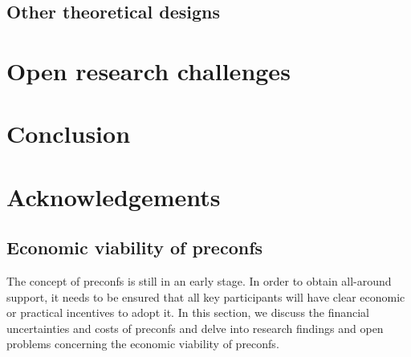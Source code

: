 \documentclass[a4paper]{article}
\theoremstyle{boldstyle}
\begin{document}
        
                

\subsection{Other theoretical designs}

\section{Open research challenges} %


\section{Conclusion}

\section*{Acknowledgements}




\newpage

% 


% 

\appendix
\subsection{Economic viability of preconfs} 
    The concept of preconfs is still in an early stage. In order to obtain all-around support, it needs to be ensured that all key participants will have clear economic or practical incentives to adopt it. In this section, we discuss the financial uncertainties and costs of preconfs and delve into research findings and open problems concerning the economic viability of preconfs. 
    
\end{document}
